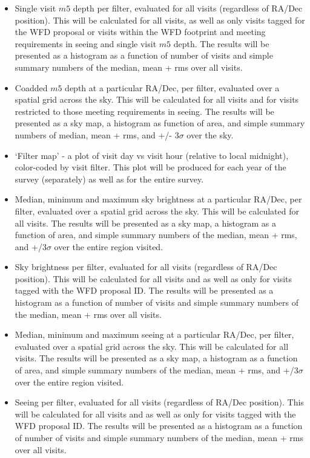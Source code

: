 \documentclass[11pt, preprint]{aastex}
\begin{document}
\begin{enumerate}
{\begin{itemize}
\item{Single visit $m5$ depth per filter, evaluated for all visits (regardless of RA/Dec position). This will be calculated for all
visits, as well as only visits tagged for the WFD proposal or visits within the WFD footprint and meeting requirements in seeing and
single visit $m5$ depth. The results will be presented as a histogram as a function of number of visits and simple summary numbers
of the median, mean + rms over all visits.}
\item{Coadded $m5$ depth at a particular RA/Dec, per filter, evaluated over a spatial grid across the sky. This will be calculated 
for all visits and for visits restricted to those meeting requirements in seeing. The results will be presented as a sky map, a histogram as function of area, and simple summary numbers of median, mean + rms, and +/- 3$\sigma$ over the sky.}
\item{`Filter map' - a plot of visit day vs visit hour (relative to local midnight), color-coded by visit filter. This plot will be produced for
each year of the survey (separately) as well as for the entire survey. }
\item{Median, minimum and maximum sky brightness at a particular RA/Dec, per filter, evaluated over a spatial
grid across the sky. This will be calculated for all visits. The results
will be presented as a sky map, a histogram as a function of area, and simple summary numbers of the median, mean + rms,
and +/3$\sigma$ over the entire region visited.}
\item{Sky brightness per filter, evaluated for all visits (regardless of RA/Dec position). This will be calculated for all
visits and as well as only for visits tagged with the WFD proposal ID. The results will be presented as a histogram as a function of number of visits and simple summary numbers of the median, mean + rms over all visits.}
\item{Median, minimum and maximum seeing at a particular RA/Dec, per filter, evaluated over a spatial
grid across the sky. This will be calculated for all visits. The results
will be presented as a sky map, a histogram as a function of area, and simple summary numbers of the median, mean + rms,
and +/3$\sigma$ over the entire region visited.}
\item{Seeing per filter, evaluated for all visits (regardless of RA/Dec position). This will be calculated for all
visits and as well as only for visits tagged with the WFD proposal ID. The results will be presented as a histogram as a function of number of visits and simple summary numbers of the median, mean + rms over all visits.}

\end{itemize}}
\end{enumerate}
\end{document}
